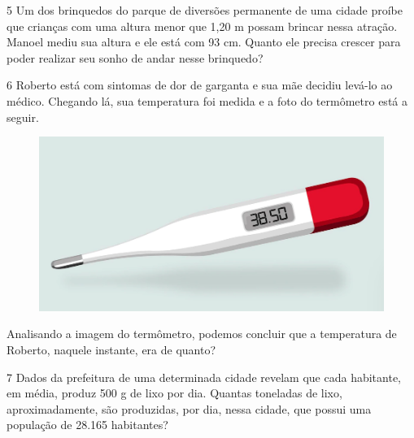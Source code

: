 \bigskip
\num{5} Um dos brinquedos do parque de diversões permanente de uma cidade
proíbe que crianças com uma altura menor que 1,20 m possam brincar nessa
atração. Manoel mediu sua altura e ele está com 93 cm. Quanto ele
precisa crescer para poder realizar seu sonho de andar nesse brinquedo?

\begin{mdframed}[linewidth=2pt,linecolor=salmao]
\mbox{}\vspace*{6cm}
\end{mdframed}

\pagebreak
\num{6} Roberto está com sintomas de dor de garganta e sua mãe decidiu levá-lo ao
médico. Chegando lá, sua temperatura foi medida e a foto do termômetro
está a seguir.

\begin{figure}[htpb!]
\centering
\includegraphics[width=\textwidth]{./imgs/mat4.png}
\end{figure}

Analisando a imagem do termômetro, podemos concluir que a temperatura de
Roberto, naquele instante, era de quanto?

\bigskip

\num{7} Dados da prefeitura de uma determinada cidade revelam que cada
habitante, em média, produz 500 g de lixo por dia. Quantas toneladas de lixo,
aproximadamente, são produzidas, por dia, nessa cidade, que
possui uma população de 28.165 habitantes?

